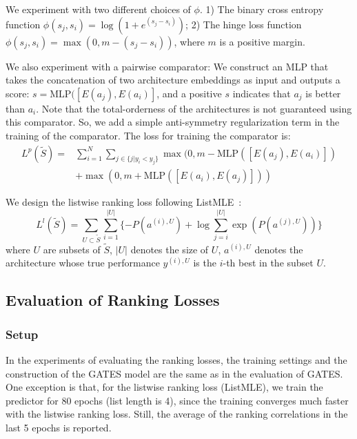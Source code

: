 We experiment with two different choices of $\phi$. 1) The binary cross entropy function $\phi(s_j, s_i)=\log(1 + e^{(s_j - s_i)})$; 
2) The hinge loss function $\phi(s_j, s_i)= \max(0, m - (s_j - s_i))$, where $m$ is a positive margin.

We also experiment with a pairwise comparator: We construct an MLP that takes the concatenation of two architecture embeddings as input and outputs a score: $s=\mbox{MLP}([E(a_j), E(a_i)]$, and a positive $s$ indicates that $a_j$ is better than $a_i$.  Note that the total-orderness of the architectures is not guaranteed using this comparator. So, we add a simple anti-symmetry regularization term in the training of the comparator. The loss for training the comparator is:
\begin{equation}
    \begin{aligned}
    L^p(\tilde{S})= &\sum_{i=1}^{N} \sum_{j \in \{j | y_i < y_j\}} \max(0, m - \mbox{MLP}([E(a_j), E(a_i)]) \\
    &+ \max(0, m + \mbox{MLP}([E(a_i), E(a_j)]))
    \end{aligned}
\end{equation}


We design the listwise ranking loss following ListMLE~\cite{xia2008listwise}:
\begin{equation}
    L^l(\tilde{S}) = \sum_{U \subset \tilde{S}} \sum_{i=1}^{|U|} \{-P(a^{(i), U}) + \log\sum_{j=i}^{|U|} \exp(P(a^{(j), U}))\}
\end{equation}
where $U$ are subsets of $\tilde{S}$, $|U|$ denotes the size of $U$, $a^{(i), U}$ denotes the architecture whose true performance $y^{(i), U}$ is the $i$-th best in the subset $U$.

\subsection{Evaluation of Ranking Losses}
\subsubsection{Setup}


In the experiments of evaluating the ranking losses, the training settings and the construction of the GATES model are the same as in the evaluation of GATES. 
One exception is that, for the listwise ranking loss (ListMLE), we train the predictor for 80 epochs (list length is 4), since the training converges much faster with the listwise ranking loss. Still, the average of the ranking correlations in the last 5 epochs is reported.

